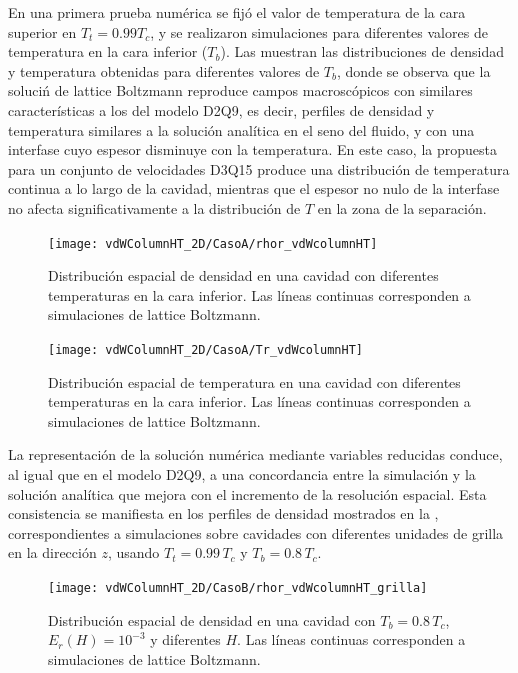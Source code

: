 En una primera prueba num\'erica se fij\'o el valor de temperatura de la cara superior en $T_t = 0.99 T_c$, y se realizaron simulaciones para diferentes valores de temperatura en la cara inferior ($T_b$). Las  muestran las distribuciones de densidad y temperatura obtenidas para diferentes valores de $T_b$, donde se observa que la soluci\'n de lattice Boltzmann reproduce campos macrosc\'opicos con similares caracter\'isticas a los del modelo D2Q9, es decir, perfiles de densidad y temperatura similares a la soluci\'on anal\'itica en el seno del fluido, y con una interfase cuyo espesor disminuye con la temperatura. En este caso, la \lbe{} propuesta para un conjunto de velocidades D3Q15 produce una distribuci\'on de temperatura continua a lo largo de la cavidad, mientras que el espesor no nulo de la interfase no afecta significativamente a la distribuci\'on de $T$ en la zona de la separaci\'on.

\begin{figure}[ht]
	\centering
	\texttt{[image: vdWColumnHT\_2D/CasoA/rhor\_vdWcolumnHT]}
	\caption{Distribuci\'on espacial de densidad en una cavidad con diferentes temperaturas en la cara inferior. Las l\'ineas continuas corresponden a simulaciones de lattice Boltzmann.}
	\label{fig:vdWColumnHT_rhor_3D}
\end{figure}

\begin{figure}[ht]
	\centering
	\texttt{[image: vdWColumnHT\_2D/CasoA/Tr\_vdWcolumnHT]}
	\caption{Distribuci\'on espacial de temperatura en una cavidad con diferentes temperaturas en la cara inferior. Las l\'ineas continuas corresponden a simulaciones de lattice Boltzmann.}
	\label{fig:vdWColumnHT_Tr_3D}
\end{figure}

La representaci\'on de la soluci\'on num\'erica mediante variables reducidas conduce, al igual que en el modelo D2Q9, a una concordancia entre la simulaci\'on y la soluci\'on anal\'itica que mejora con el incremento de la resoluci\'on espacial. Esta consistencia se manifiesta en los perfiles de densidad mostrados en la , correspondientes a simulaciones sobre cavidades con diferentes unidades de grilla en la direcci\'on $z$, usando $T_t = 0.99 \, T_c$ y $T_b = 0.8 \, T_c$.

\begin{figure}[ht]
	\centering
	\texttt{[image: vdWColumnHT\_2D/CasoB/rhor\_vdWcolumnHT\_grilla]}
	\caption{Distribuci\'on espacial de densidad en una cavidad con $T_b = 0.8 \, T_c$, $E_r(H)=10^{-3}$ y diferentes $H$. Las l\'ineas continuas corresponden a simulaciones de lattice Boltzmann.}
	\label{fig:vdWColumnHT_rhor_grilla_3D}
\end{figure}


